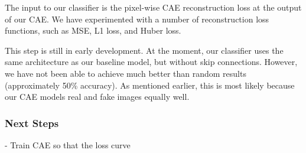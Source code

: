 \documentclass{article} %
\begin{document}
The input to our classifier is the pixel-wise CAE reconstruction loss at the output of our CAE. We have experimented with a number of reconstruction loss functions, such as MSE, L1 loss, and Huber loss.

This step is still in early development. At the moment, our classifier uses the same architecture as our baseline model, but without skip connections. However, we have not been able to achieve much better than random results (approximately 50\% accuracy). As mentioned earlier, this is most likely because our CAE models real and fake images equally well.

\subsubsection{Next Steps}
\label{next_steps}

- Train CAE so that the loss curve 

\label{last_page}



\end{document}
